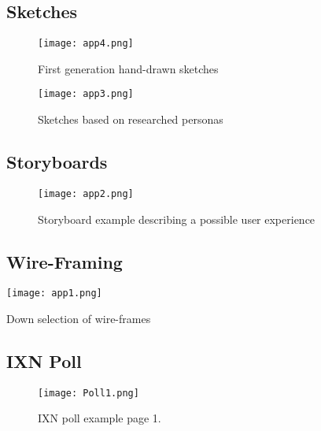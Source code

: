  \newpage


\begin{landscape}
\subsection{Sketches}
 \begin{figure}[H]
      \centering
      \texttt{[image: app4.png]}
      \caption{First generation hand-drawn sketches}
 \end{figure}
\end{landscape}

 \newpage

\begin{landscape}
 \begin{figure}[H]
      \centering
      \texttt{[image: app3.png]}
      \caption{Sketches based on researched personas}
 \end{figure}
  \end{landscape}

\newpage

\begin{landscape}
\subsection{Storyboards}
 \begin{figure}[H]
      \centering
      \texttt{[image: app2.png]}
      \caption{Storyboard example describing a possible user experience}
 \end{figure}

 \newpage

\subsection{Wire-Framing}
\begin{table}[H]
      \centering
      \texttt{[image: app1.png]}
      \caption{Down selection of wire-frames}
 \end{table}
  \end{landscape}
\subsection{IXN Poll}
\begin{figure}[H]
      \centering
      \texttt{[image: Poll1.png]}
      \caption{IXN poll example page 1.}
 \end{figure}

